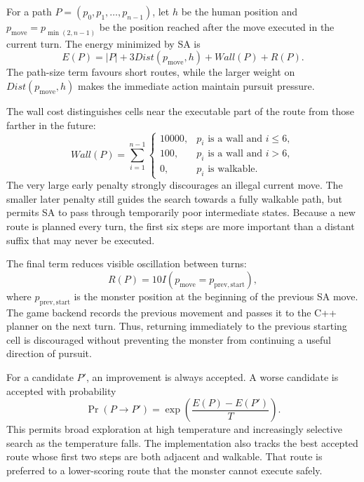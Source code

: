 For a path $P=(p_0,p_1,\ldots,p_{n-1})$, let $h$ be the human position and
$p_{\mathrm{move}}=p_{\min(2,n-1)}$ be the position reached after the move
executed in the current turn. The energy minimized by SA is
\[
E(P)=|P|+3Dist(p_{\mathrm{move}},h)+Wall(P)+R(P).
\]
The path-size term favours short routes, while the larger weight on
$Dist(p_{\mathrm{move}},h)$ makes the immediate action maintain pursuit
pressure.

The wall cost distinguishes cells near the executable part of the route from
those farther in the future:
\[
Wall(P)=\sum_{i=1}^{n-1}
\begin{cases}
10000, & p_i\text{ is a wall and }i\leq 6,\\
100,   & p_i\text{ is a wall and }i>6,\\
0,     & p_i\text{ is walkable.}
\end{cases}
\]
The very large early penalty strongly discourages an illegal current move. The
smaller later penalty still guides the search towards a fully walkable path,
but permits SA to pass through temporarily poor intermediate states. Because a
new route is planned every turn, the first six steps are more important than a
distant suffix that may never be executed.

The final term reduces visible oscillation between turns:
\[
R(P)=10I(p_{\mathrm{move}}=p_{\mathrm{prev,start}}),
\]
where $p_{\mathrm{prev,start}}$ is the monster position at the beginning of
the previous SA move. The game backend records the previous movement and passes
it to the C++ planner on the next turn. Thus, returning immediately to the
previous starting cell is discouraged without preventing the monster from
continuing a useful direction of pursuit.

For a candidate $P'$, an improvement is always accepted. A worse candidate is
accepted with probability
\[
\Pr(P\rightarrow P')=
\exp\left(\frac{E(P)-E(P')}{T}\right).
\]
This permits broad exploration at high temperature and increasingly selective
search as the temperature falls. The implementation also tracks the best
accepted route whose first two steps are both adjacent and walkable. That route
is preferred to a lower-scoring route that the monster cannot execute safely.

